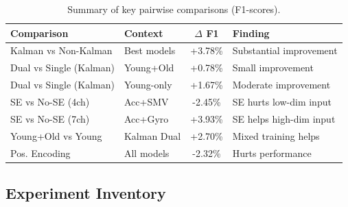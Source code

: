 \documentclass{article}
\begin{document}
\begin{table}[htbp]
    \centering
    \caption{Summary of key pairwise comparisons (F1-scores).}
    \label{tab:statistical_summary}
    \begin{tabular}{llcl}
        \toprule
        \textbf{Comparison} & \textbf{Context} & \textbf{$\Delta$ F1} & \textbf{Finding} \\
        \midrule
        Kalman vs Non-Kalman & Best models & +3.78\% & Substantial improvement \\
        Dual vs Single (Kalman) & Young+Old & +0.78\% & Small improvement \\
        Dual vs Single (Kalman) & Young-only & +1.67\% & Moderate improvement \\
        SE vs No-SE (4ch) & Acc+SMV & -2.45\% & SE hurts low-dim input \\
        SE vs No-SE (7ch) & Acc+Gyro & +3.93\% & SE helps high-dim input \\
        Young+Old vs Young & Kalman Dual & +2.70\% & Mixed training helps \\
        Pos. Encoding & All models & -2.32\% & Hurts performance \\
        \bottomrule
    \end{tabular}
\end{table}

\subsection{Experiment Inventory}
\end{document}
